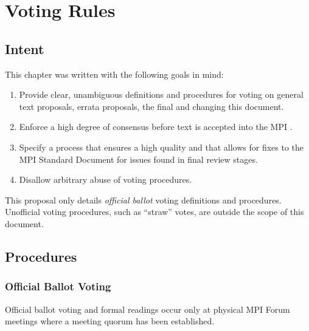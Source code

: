 \chapter{Voting Rules}


\section{Intent}

This chapter was written with the following goals in mind:

\begin{enumerate}
\item Provide clear, unambiguous definitions and procedures for voting
  on general text proposals, errata proposals, the final
  {\color{red}{MPI Standard Document}} and changing this document.
\item Enforce a high degree of consensus before text is accepted into
  the MPI {\color{red}{Standard Document}}.
\item {\color{red} Specify} a process that ensures a high quality
  {\color{red}{MPI Standard Document}} and that allows for fixes to the
  MPI Standard Document for issues found in final review stages.
\item Disallow arbitrary abuse of voting procedures.
\end{enumerate}

This proposal only details {\em official ballot} voting definitions
and procedures.  Unofficial voting procedures, such as ``straw''
votes, are outside the scope of this document.


\section{Procedures}


\subsection{Official Ballot Voting}
\label{subsec:official-ballot-voting}

Official ballot voting and formal readings occur only at physical MPI
Forum meetings where a meeting quorum has been established.

